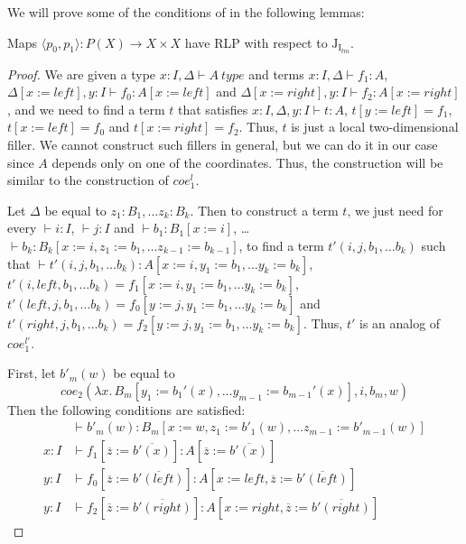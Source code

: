 \documentclass[reqno]{amsart}
\theoremstyle{definition}
\theoremstyle{remark}
\newcommand{\repl}{:=}
\newcommand{\I}{\mathrm{I}}
\newcommand{\J}{\mathrm{J}}
\numberwithin{figure}{section}
\begin{document}
We will prove some of the conditions of  in the following lemmas:
\begin{lem}[Jtm]
Maps $\langle p_0, p_1 \rangle : P(X) \to X \times X$ have RLP with respect to $\J_{\I_{tm}}$.
\end{lem}
\begin{proof}
We are given a type $x : I, \Delta \vdash A\ type$ and terms $x : I, \Delta \vdash f_1 : A$, $\Delta[x \repl left], y : I \vdash f_0 : A[x \repl left]$ and $\Delta[x \repl right], y : I \vdash f_2 : A[x \repl right]$,
and we need to find a term $t$ that satisfies $x : I, \Delta, y : I \vdash t : A$, $t[y \repl left] = f_1$, $t[x \repl left] = f_0$ and $t[x \repl right] = f_2$.
Thus, $t$ is just a local two-dimensional filler.
We cannot construct such fillers in general, but we can do it in our case since $A$ depends only on one of the coordinates.
Thus, the construction will be similar to the construction of $coe^l_1$.

Let $\Delta$ be equal to $z_1 : B_1, \ldots z_k : B_k$.
Then to construct a term $t$, we just need for every $\vdash i : I$, $\vdash j : I$ and $\vdash b_1 : B_1[x \repl i]$, \ldots $\vdash b_k : B_k[x \repl i, z_1 \repl b_1, \ldots z_{k-1} \repl b_{k-1}]$,
to find a term $t'(i, j, b_1, \ldots b_k)$ such that $\vdash t'(i, j, b_1, \ldots b_k) : A[x \repl i, y_1 \repl b_1, \ldots y_k \repl b_k]$, $t'(i, left, b_1, \ldots b_k) = f_1[x \repl i, y_1 \repl b_1, \ldots y_k \repl b_k]$,
$t'(left, j, b_1, \ldots b_k) = f_0[y \repl j, y_1 \repl b_1, \ldots y_k \repl b_k]$ and $t'(right, j, b_1, \ldots b_k) = f_2[y \repl j, y_1 \repl b_1, \ldots y_k \repl b_k]$.
Thus, $t'$ is an analog of $coe^{l'}_1$.

First, let $b'_m(w)$ be equal to
\[ coe_2(\lambda x.\,B_m[y_1 \repl b_1'(x), \ldots y_{m-1} \repl b_{m-1}'(x)], i, b_m, w) \]
Then the following conditions are satisfied:
\begin{align*}
& \vdash b'_m(w) : B_m[x \repl w, z_1 \repl b'_1(w), \ldots z_{m-1} \repl b'_{m-1}(w)] \\
x : I & \vdash f_1[\overline{z} \repl \overline{b'(x)}] : A[\overline{z} \repl \overline{b'(x)}] \\
y : I & \vdash f_0[\overline{z} \repl \overline{b'(left)}] : A[x \repl left, \overline{z} \repl \overline{b'(left)}] \\
y : I & \vdash f_2[\overline{z} \repl \overline{b'(right)}] : A[x \repl right, \overline{z} \repl \overline{b'(right)}]
\end{align*}
\end{proof}
\end{document}
